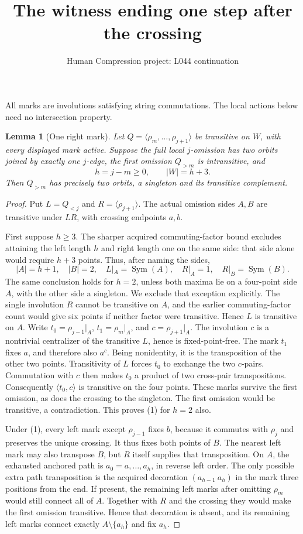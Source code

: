 \documentclass[11pt,a4paper]{article}
\title{The witness ending one step after the crossing}
\author{Human Compression project: L044 continuation}
\date{}
\newtheorem{lemma}{Lemma}
\newcommand{\gen}[1]{\langle#1\rangle}
\newcommand{\Sym}{\operatorname{Sym}}
\begin{document}
\maketitle
All marks are involutions satisfying string commutations.
The local actions below need no intersection property.

\begin{lemma}[One right mark]
Let $Q=\gen{\rho_m,\ldots,\rho_{j+1}}$ be transitive
on $W$, with every displayed mark active. Suppose the
full local $j$-omission has two orbits joined by exactly
one $j$-edge, the first omission $Q_{>m}$ is
intransitive, and
\[
                    h=j-m\ge0,\qquad |W|=h+3.
\]
Then $Q_{>m}$ has precisely two orbits, a singleton
and its transitive complement.
\end{lemma}
\begin{proof}
Put $L=Q_{<j}$ and $R=\gen{\rho_{j+1}}$. The
actual omission sides $A,B$ are transitive under
$LR$, with crossing endpoints $a,b$.

First suppose $h\ge3$. The sharper acquired
commuting-factor bound excludes attaining the
left length $h$ and right length one on the
same side: that side alone would require $h+3$
points. Thus, after naming the sides,
\[
 |A|=h+1,\quad |B|=2,\quad L|_A=\Sym(A),\quad
 R|_A=1,\quad R|_B=\Sym(B).
                                                        \tag{1}
\]
The same conclusion holds for $h=2$, unless both
maxima lie on a four-point side $A$, with the
other side a singleton. We exclude that exception
explicitly. The single involution $R$ cannot be
transitive on $A$, and the earlier commuting-factor
count would give six points if neither factor were
transitive. Hence $L$ is transitive on $A$. Write
$t_0=\rho_{j-1}|_A$, $t_1=\rho_m|_A$, and
$c=\rho_{j+1}|_A$. The involution $c$ is a nontrivial
centralizer of the transitive $L$, hence is fixed-point-free.
The mark $t_1$ fixes $a$, and therefore also $a^c$.
Being nonidentity, it is the transposition of the
other two points. Transitivity of $L$ forces
$t_0$ to exchange the two $c$-pairs. Commutation
with $c$ then makes $t_0$ a product of two
cross-pair transpositions. Consequently
$\gen{t_0,c}$ is transitive on the four points.
These marks survive the first omission, as does
the crossing to the singleton. The first omission
would be transitive, a contradiction. This proves
(1) for $h=2$ also.

Under (1), every left mark except $\rho_{j-1}$
fixes $b$, because it commutes with $\rho_j$ and
preserves the unique crossing. It thus fixes
both points of $B$. The nearest left mark may
also transpose $B$, but $R$ itself supplies that
transposition. On $A$, the exhausted anchored
path is $a_0=a,\ldots,a_h$, in reverse left
order. The only possible extra path transposition
is the acquired decoration $(a_{h-1}\ a_h)$ in
the mark three positions from the end. If present,
the remaining left marks after omitting $\rho_m$
would still connect all of $A$. Together with
$R$ and the crossing they would make the first
omission transitive. Hence that decoration is absent,
and its remaining left marks connect exactly
$A\setminus\{a_h\}$ and fix $a_h$.


\end{proof}
\end{document}
